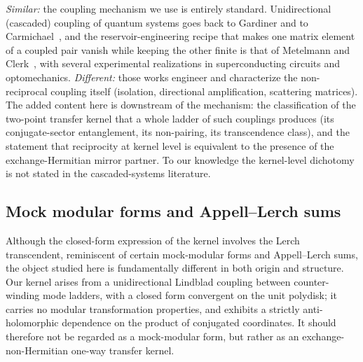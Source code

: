 \documentclass[11pt,a4paper]{article}
\begin{document}
\emph{Similar:} the coupling mechanism we use is entirely standard.
Unidirectional (cascaded) coupling of quantum systems goes back to Gardiner and
to Carmichael~\cite{Gardiner1993,Carmichael1993}, and the reservoir-engineering
recipe that makes one matrix element of a coupled pair vanish while keeping the
other finite is that of Metelmann and Clerk~\cite{MetelmannClerk2015}, with
several experimental realizations in superconducting circuits and
optomechanics. \emph{Different:} those works engineer and characterize the
non-reciprocal coupling itself (isolation, directional amplification,
scattering matrices). The added content here is downstream of the mechanism:
the classification of the two-point transfer kernel that a whole ladder of such
couplings produces (its conjugate-sector entanglement, its non-pairing, its
transcendence class), and the statement that reciprocity at kernel level is
equivalent to the presence of the exchange-Hermitian mirror partner. To our
knowledge the kernel-level dichotomy is not stated in the cascaded-systems
literature.

\subsection{Mock modular forms and Appell--Lerch sums}
\label{sec:mock}

Although the closed-form expression of the kernel involves the Lerch
transcendent, reminiscent of certain mock-modular forms and Appell--Lerch sums,
the object studied here is fundamentally different in both origin and
structure. Our kernel arises from a unidirectional Lindblad coupling between
counter-winding mode ladders, with a closed form convergent on the unit
polydisk; it carries no modular transformation properties, and exhibits a
strictly anti-holomorphic dependence on the product of conjugated coordinates.
It should therefore not be regarded as a mock-modular form, but rather as an
exchange-non-Hermitian one-way transfer kernel.
\end{document}
